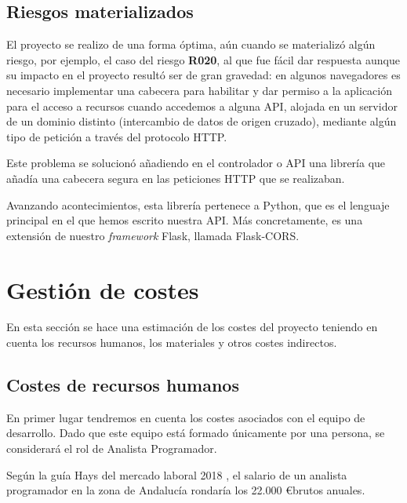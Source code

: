 \subsection{Riesgos materializados}

El proyecto se realizo de una forma óptima, aún cuando se materializó algún riesgo, por ejemplo, el caso del riesgo \textbf{R020}, al que fue fácil dar respuesta aunque su impacto en el proyecto resultó ser de gran gravedad: en algunos navegadores es necesario implementar una cabecera para habilitar y dar permiso a la aplicación para el acceso a recursos cuando accedemos a alguna API, alojada en un servidor de un dominio distinto (intercambio de datos de origen cruzado), mediante algún tipo de petición a través del protocolo HTTP\cite{cors}.

Este problema se solucionó añadiendo en el controlador o API una librería que añadía una cabecera segura en las peticiones HTTP que se realizaban\cite{corsflask}.

Avanzando acontecimientos, esta librería pertenece a Python, que es el lenguaje principal en el que hemos escrito nuestra API. Más concretamente, es una extensión de nuestro \textit{framework} Flask, llamada Flask-CORS\cite{corsflask2}.

\section{Gestión de costes}

En esta sección se hace una estimación de los costes del proyecto teniendo en cuenta los recursos humanos, los materiales y otros costes indirectos.

\subsection{Costes de recursos humanos}

En primer lugar tendremos en cuenta los costes asociados con el equipo de desarrollo. Dado que este equipo está formado únicamente por una persona, se considerará el rol de Analista Programador.

Según la guía Hays del mercado laboral 2018 \cite{guiahays}, el salario de un analista programador en la zona de Andalucía rondaría los 22.000 \euro brutos anuales.


